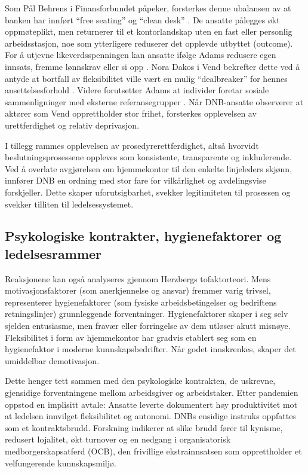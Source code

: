 Som Pål Behrens i Finansforbundet påpeker, forsterkes denne ubalansen av at banken har innført \enquote{free seating} og \enquote{clean desk} \parencite{biernat2026}. De ansatte pålegges økt oppmøteplikt, men returnerer til et kontorlandskap uten en fast eller personlig arbeidsstasjon, noe som ytterligere reduserer det opplevde utbyttet (outcome). For å utjevne likeverdsspenningen kan ansatte ifølge Adams redusere egen innsats, fremme lønnskrav eller si opp \parencite[s.~105]{nerstad2023}. Nora Dakos i Vend bekrefter dette ved å antyde at bortfall av fleksibilitet ville vært en mulig \enquote{dealbreaker} for hennes ansettelsesforhold \parencite{ingebrigtsen_vend_2026}. Videre forutsetter Adams at individer foretar sosiale sammenligninger med eksterne referansegrupper \parencite[s.~105]{nerstad2023}. Når DNB-ansatte observerer at aktører som Vend opprettholder stor frihet, forsterkes opplevelsen av urettferdighet og relativ deprivasjon.

I tillegg rammes opplevelsen av prosedyrerettferdighet, altså hvorvidt beslutningsprosessene oppleves som konsistente, transparente og inkluderende. Ved å overlate avgjørelsen om hjemmekontor til den enkelte linjeleders skjønn, innfører DNB en ordning med stor fare for vilkårlighet og avdelingsvise forskjeller. Dette skaper uforutsigbarhet, svekker legitimiteten til prosessen og svekker tilliten til ledelsessystemet.

\subsection{Psykologiske kontrakter, hygienefaktorer og ledelsesrammer}

Reaksjonene kan også analyseres gjennom Herzbergs tofaktorteori. Mens motivasjonsfaktorer (som anerkjennelse og ansvar) fremmer varig trivsel, representerer hygienefaktorer (som fysiske arbeidsbetingelser og bedriftens retningslinjer) grunnleggende forventninger. Hygienefaktorer skaper i seg selv sjelden entusiasme, men fravær eller forringelse av dem utløser akutt misnøye. Fleksibilitet i form av hjemmekontor har gradvis etablert seg som en hygienefaktor i moderne kunnskapsbedrifter. Når godet innskrenkes, skaper det umiddelbar demotivasjon.

Dette henger tett sammen med den psykologiske kontrakten, de uskrevne, gjensidige forventningene mellom arbeidsgiver og arbeidstaker. Etter pandemien oppstod en implisitt avtale: Ansatte leverte dokumentert høy produktivitet mot at ledelsen innvilget fleksibilitet og autonomi. DNBs ensidige instruks oppfattes som et kontraktsbrudd. Forskning indikerer at slike brudd fører til kynisme, redusert lojalitet, økt turnover og en nedgang i organisatorisk medborgerskapsatferd (OCB), den frivillige ekstrainnsatsen som opprettholder et velfungerende kunnskapsmiljø.

